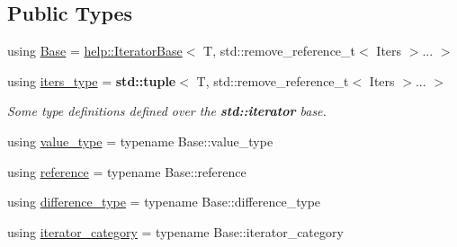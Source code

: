\subsection*{Public Types}
\begin{DoxyCompactItemize}
\item 
using \hyperlink{classit_1_1ZipIter_a360e2773db66d921e24432654349854b}{Base} = \hyperlink{namespaceit_1_1help_a3d72c14eeb8c9d60c70f79b551c578fe}{help\+::\+Iterator\+Base}$<$ T, std\+::remove\+\_\+reference\+\_\+t$<$ Iters $>$... $>$
\item 
using \hyperlink{classit_1_1ZipIter_abe375cba227d26df38cbf32c3229a5ed}{iters\+\_\+type} = {\bf std\+::tuple}$<$ T, std\+::remove\+\_\+reference\+\_\+t$<$ Iters $>$... $>$
\begin{DoxyCompactList}\small\item\em Some type definitions defined over the {\bf std\+::iterator} base. \end{DoxyCompactList}\item 
using \hyperlink{classit_1_1ZipIter_a053b769492752c329d349083f36d0380}{value\+\_\+type} = typename Base\+::value\+\_\+type
\item 
using \hyperlink{classit_1_1ZipIter_a2c1a275bc7c04e1ab4d7827024fc6c19}{reference} = typename Base\+::reference
\item 
using \hyperlink{classit_1_1ZipIter_aa43876b6c6be6aa68d6b8ce7c93cf8fd}{difference\+\_\+type} = typename Base\+::difference\+\_\+type
\item 
using \hyperlink{classit_1_1ZipIter_a0b1ee44643a34f21062bfd17c873331f}{iterator\+\_\+category} = typename Base\+::iterator\+\_\+category
\end{DoxyCompactItemize}
